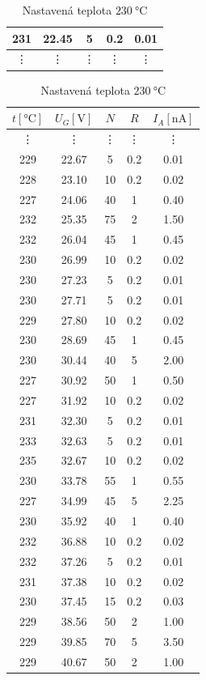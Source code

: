 \documentclass[titlepage]{article}
\begin{document}
\begin{table}[H]
\begin{minipage}{.49 \textwidth}
\begin{tabular}{c||c|c|c|c}
            231 & 22.45 & 5 & 0.2 & 0.01 \\ \hline
            \vdots & \vdots & \vdots & \vdots & \vdots
        \end{tabular}
    \end{minipage}%
    \begin{minipage}{.49 \textwidth}
      \centering
        \begin{tabular}{c||c|c|c|c}
            $t [\si{\celsius}]$ & $U_G [\si{\volt}]$ & $N$ & $R$ & $I_A [\si{\nano\ampere}]$ \\ \hline\hline
            \vdots & \vdots & \vdots & \vdots & \vdots \\ \hline
            229 & 22.67 & 5 & 0.2 & 0.01 \\ \hline
        228 & 23.10 & 10 & 0.2 & 0.02 \\ \hline
        227 & 24.06 & 40 & 1 & 0.40 \\ \hline
        232 & 25.35 & 75 & 2 & 1.50 \\ \hline
        232 & 26.04 & 45 & 1 & 0.45 \\ \hline
        230 & 26.99 & 10 & 0.2 & 0.02 \\ \hline
        230 & 27.23 & 5 & 0.2 & 0.01 \\ \hline
        230 & 27.71 & 5 & 0.2 & 0.01 \\ \hline
        229 & 27.80 & 10 & 0.2 & 0.02 \\ \hline
        230 & 28.69 & 45 & 1 & 0.45 \\ \hline
        230 & 30.44 & 40 & 5 & 2.00 \\ \hline
        227 & 30.92 & 50 & 1 & 0.50 \\ \hline
        227 & 31.92 & 10 & 0.2 & 0.02 \\ \hline
        231 & 32.30 & 5 & 0.2 & 0.01 \\ \hline
        233 & 32.63 & 5 & 0.2 & 0.01 \\ \hline
        235 & 32.67 & 10 & 0.2 & 0.02 \\ \hline
        230 & 33.78 & 55 & 1 & 0.55 \\ \hline
        227 & 34.99 & 45 & 5 & 2.25 \\ \hline
        230 & 35.92 & 40 & 1 & 0.40 \\ \hline
        232 & 36.88 & 10 & 0.2 & 0.02 \\ \hline
        232 & 37.26 & 5 & 0.2 & 0.01 \\ \hline
        231 & 37.38 & 10 & 0.2 & 0.02 \\ \hline
        230 & 37.45 & 15 & 0.2 & 0.03 \\ \hline
        229 & 38.56 & 50 & 2 & 1.00 \\ \hline
        229 & 39.85 & 70 & 5 & 3.50 \\ \hline
        229 & 40.67 & 50 & 2 & 1.00
        \end{tabular}
    \end{minipage}
    \caption{Nastavená teplota $230\ \si{\celsius}$}
\end{table}
\end{document}
